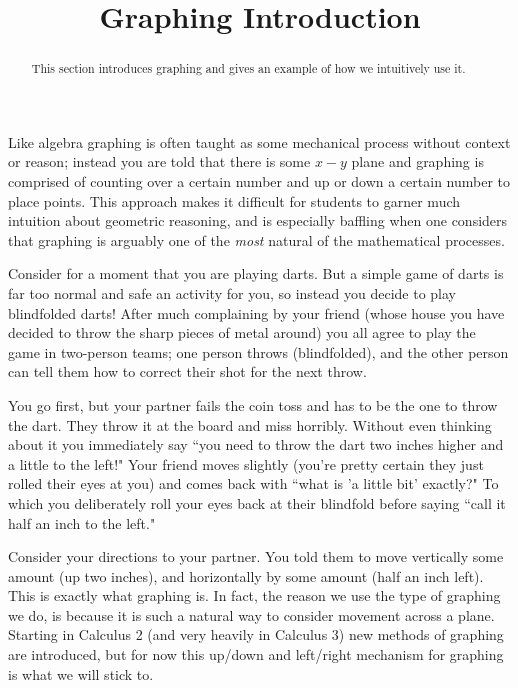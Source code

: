 \documentclass{ximeraXloud}
\title{Graphing Introduction}
\begin{document}
\begin{abstract}
    This section introduces graphing and gives an example of how we intuitively use it.
\end{abstract}
\maketitle

Like algebra graphing is often taught as some mechanical process without context or reason; instead you are told that there is some $x-y$ plane and graphing is comprised of counting over a certain number and up or down a certain number to place points. This approach makes it difficult for students to garner much intuition about geometric reasoning, and is especially baffling when one considers that graphing is arguably one of the \textit{most} natural of the mathematical processes.

\begin{example}
    Consider for a moment that you are playing darts. But a simple game of darts is far too normal and safe an activity for you, so instead you decide to play blindfolded darts! After much complaining by your friend (whose house you have decided to throw the sharp pieces of metal around) you all agree to play the game in two-person teams; one person throws (blindfolded), and the other person can tell them how to correct their shot for the next throw.
    
    You go first, but your partner fails the coin toss and has to be the one to throw the dart. They throw it at the board and miss horribly. Without even thinking about it you immediately say ``you need to throw the dart two inches higher and a little to the left!" Your friend moves slightly (you're pretty certain they just rolled their eyes at you) and comes back with ``what is 'a little bit' exactly?" To which you deliberately roll your eyes back at their blindfold before saying ``call it half an inch to the left."
\end{example}

\begin{explanation}
    Consider your directions to your partner. You told them to move vertically some amount (up two inches), and horizontally by some amount (half an inch left). This is exactly what graphing is. In fact, the reason we use the type of graphing we do, is because it is such a natural way to consider movement across a plane. Starting in Calculus 2 (and very heavily in Calculus 3) new methods of graphing are introduced, but for now this up/down and left/right mechanism for graphing is what we will stick to.
\end{explanation}
\end{document}
